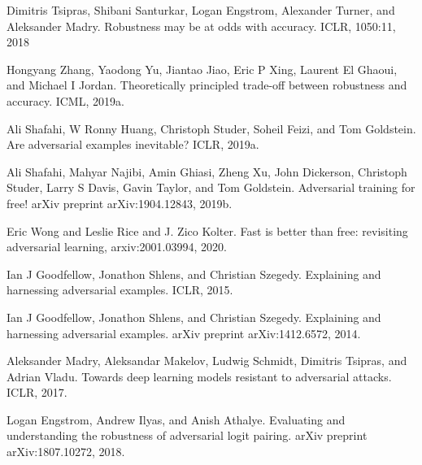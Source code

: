 \documentclass{article}
\begin{document}
\begin{thebibliography}{100} 
	 {Dimitris Tsipras, Shibani Santurkar, Logan Engstrom, Alexander Turner, and Aleksander Madry. Robustness may be at odds with accuracy. ICLR, 1050:11, 2018}

	 {Hongyang Zhang, Yaodong Yu, Jiantao Jiao, Eric P Xing, Laurent El Ghaoui, and Michael I Jordan. Theoretically principled trade-off between robustness and accuracy. ICML, 2019a.}
	
	 {Ali Shafahi, W Ronny Huang, Christoph Studer, Soheil Feizi, and Tom Goldstein. Are adversarial examples inevitable? ICLR, 2019a.}
	
	 {Ali Shafahi, Mahyar Najibi, Amin Ghiasi, Zheng Xu, John Dickerson, Christoph Studer, Larry S
		Davis, Gavin Taylor, and Tom Goldstein. Adversarial training for free!
		arXiv preprint
		arXiv:1904.12843, 2019b.}
	
	 {Eric Wong and Leslie Rice and J. Zico Kolter. Fast is better than free: revisiting adversarial learning, arxiv:2001.03994, 2020.}
	
	 {Ian J Goodfellow, Jonathon Shlens, and Christian Szegedy. Explaining and harnessing adversarial examples. ICLR, 2015.}
	
	 {Ian J Goodfellow, Jonathon Shlens, and Christian Szegedy. Explaining and harnessing adversarial examples. arXiv preprint arXiv:1412.6572, 2014.}
	
	 {Aleksander Madry, Aleksandar Makelov, Ludwig Schmidt, Dimitris Tsipras, and Adrian Vladu. Towards deep learning models resistant to adversarial attacks. ICLR, 2017.}
	
	 {Logan Engstrom, Andrew Ilyas, and Anish Athalye. Evaluating and understanding the robustness of adversarial logit pairing. arXiv preprint arXiv:1807.10272, 2018.}
	
\end{thebibliography}
	
\end{document}
